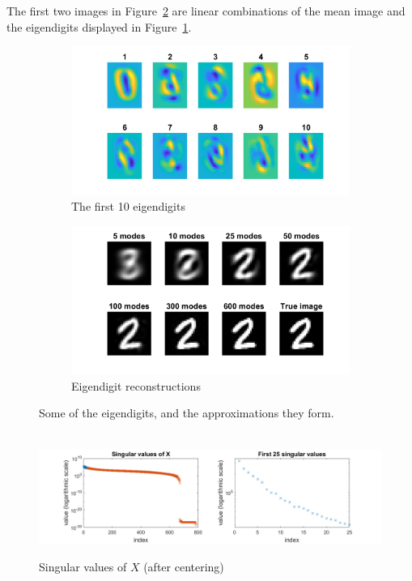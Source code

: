 \documentclass{article}
\begin{document}
The first two images in Figure~\ref{fig:approximations} are linear combinations of the mean image and the eigendigits displayed in Figure~\ref{fig:eigendigits}.
\begin{figure}
	\centering
	\begin{subfigure}{.5\textwidth}
		\centering
		\includegraphics[scale=0.45]{eigendigits}
		\caption{The first 10 eigendigits}    	
		\label{fig:eigendigits}
	\end{subfigure}%
	\begin{subfigure}{.5\textwidth}
		\centering
		\includegraphics[scale=0.45]{approximations}
		\caption{Eigendigit reconstructions}
		\label{fig:approximations}
	\end{subfigure}
	\caption{Some of the eigendigits, and the approximations they form. }
	\label{fig:fig1}
\end{figure}
\begin{figure}
	\centering
	\;\\
	\includegraphics[scale=0.72]{singular_values}
	\caption{Singular values of $X$ (after centering)}
	\label{fig:singular_values}
\end{figure}
\end{document}
